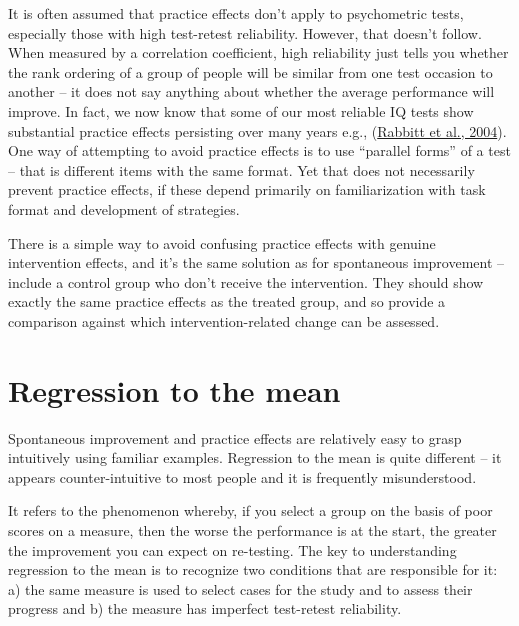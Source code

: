 \documentclass{krantz}
\begin{document}
It is often assumed that practice effects don't apply to psychometric tests, especially those with high test-retest reliability. However, that doesn't follow. When measured by a correlation coefficient, high reliability just tells you whether the rank ordering of a group of people will be similar from one test occasion to another -- it does not say anything about whether the average performance will improve. In fact, we now know that some of our most reliable IQ tests show substantial practice effects persisting over many years e.g., (\protect\hyperlink{ref-rabbitt2004}{Rabbitt et al., 2004}). One way of attempting to avoid practice effects is to use ``parallel forms'' of a test -- that is different items with the same format. Yet that does not necessarily prevent practice effects, if these depend primarily on familiarization with task format and development of strategies.

There is a simple way to avoid confusing practice effects with genuine intervention effects, and it's the same solution as for spontaneous improvement -- include a control group who don't receive the intervention. They should show exactly the same practice effects as the treated group, and so provide a comparison against which intervention-related change can be assessed.

\hypertarget{regression-to-the-mean}{%
\section{Regression to the mean}\label{regression-to-the-mean}}

Spontaneous improvement and practice effects are relatively easy to grasp intuitively using familiar examples. Regression to the mean is quite different -- it appears counter-intuitive to most people and it is frequently misunderstood.

It refers to the phenomenon whereby, if you select a group on the basis of poor scores on a measure, then the worse the performance is at the start, the greater the improvement you can expect on re-testing. The key to understanding regression to the mean is to recognize two conditions that are responsible for it: a) the same measure is used to select cases for the study and to assess their progress and b) the measure has imperfect test-retest reliability.
\end{document}
